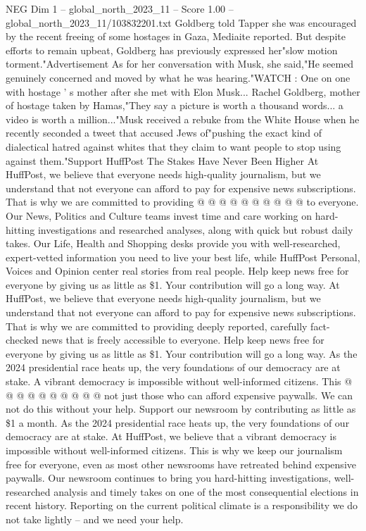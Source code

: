 \begin{textsample}{NEG Dim 1 – global\_north\_2023\_11 – Score 1.00 – global\_north\_2023\_11/103832201.txt}  \label{ex:f1_neg_197}
Goldberg told Tapper she was encouraged by the recent freeing of some hostages in Gaza, Mediaite reported.
But despite efforts to remain upbeat, Goldberg has previously expressed her"slow motion torment."Advertisement As for her conversation with Musk, she said,"He seemed genuinely concerned and moved by what he was hearing."WATCH : One on one with hostage ' s mother after she met with Elon Musk...
Rachel Goldberg, mother of hostage taken by Hamas,"They say a picture is worth a thousand words... a video is worth a million..."Musk received a rebuke from the White House when he recently seconded a tweet that accused Jews of"pushing the exact kind of dialectical hatred against whites that they claim to want people to stop using against them."Support HuffPost The Stakes Have Never Been Higher At HuffPost, we believe that everyone needs high-quality journalism, but we understand that not everyone can afford to pay for expensive news subscriptions.
That is why we are committed to providing @ @ @ @ @ @ @ @ @ @ to everyone.
Our News, Politics and Culture teams invest time and care working on hard-hitting investigations and researched analyses, along with quick but robust daily takes.
Our Life, Health and Shopping desks provide you with well-researched, expert-vetted information you need to live your best life, while HuffPost Personal, Voices and Opinion center real stories from real people.
Help keep news free for everyone by giving us as little as \$1.
Your contribution will go a long way.
At HuffPost, we believe that everyone needs high-quality journalism, but we understand that not everyone can afford to pay for expensive news subscriptions.
That is why we are committed to providing deeply reported, carefully fact-checked news that is freely accessible to everyone.
Help keep news free for everyone by giving us as little as \$1.
Your contribution will go a long way.
As the 2024 presidential race heats up, the very foundations of our democracy are at stake.
A vibrant democracy is impossible without well-informed citizens.
This @ @ @ @ @ @ @ @ @ @ not just those who can afford expensive paywalls.
We can not do this without your help.
Support our newsroom by contributing as little as \$1 a month.
As the 2024 presidential race heats up, the very foundations of our democracy are at stake.
At HuffPost, we believe that a vibrant democracy is impossible without well-informed citizens.
This is why we keep our journalism free for everyone, even as most other newsrooms have retreated behind expensive paywalls.
Our newsroom continues to bring you hard-hitting investigations, well-researched analysis and timely takes on one of the most consequential elections in recent history.
Reporting on the current political climate is a responsibility we do not take lightly -- and we need your help.

\end{textsample}
